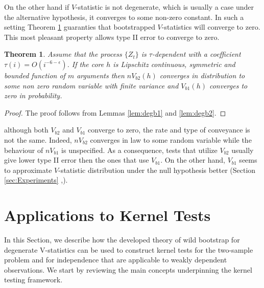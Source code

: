 \documentclass{article} %
\newtheorem{Theorem}{Theorem}
\begin{document}
On the other hand if $V$-statistic is not degenerate, which is usually a case under the alternative hypothesis, it converges to some non-zero constant. In such a setting Theorem \ref{th:mainTwo} guaranties that bootstrapped $V$-statistics will converge to zero. This most pleasant property allows type II error to converge to zero.    
\begin{Theorem}
\label{th:mainTwo}
Assume that the process $\{Z_t\}$ is $\tau$-dependent with a coefficient $\tau(i) = O(i^{-6-\epsilon})$. If the core $h$ is  Lipschitz continuous, symmetric and bounded function of $m$ arguments  then $n V_{b2}(h)$ converges in distribution to some non zero random variable with finite variance  and $V_{b1}(h)$  converges to zero in probability. 
\end{Theorem}
\begin{proof}
 The proof follows from Lemmas \ref{lem:degb1} and \ref{lem:degb2}.
\end{proof}
although both $V_{b2}$ and $V_{b1}$  converge to zero, the rate and type of conveyance is not the same. Indeed, $n V_{b2}$ converges in law to some random variable while the behaviour of $n V_{b1}$ is unspecified. As a consequence, tests that utilize $V_{b2}$ usually give lower type II error then the ones that use $V_{b1}$. On the other hand, $V_{b1}$ seems to approximate $V$-statistic distribution under the null hypothesis better (Section \ref{sec:Experiments} ,\cite[Section 4.3]{leucht_dependent_2013}).  

\section{Applications to Kernel Tests}
In this Section, we describe how the developed theory of wild bootstrap for degenerate V-statistics can be used to construct kernel tests for the two-sample problem and for independence that are applicable to weakly dependent observations. We start by reviewing the main concepts underpinning the kernel testing framework.
\end{document}
